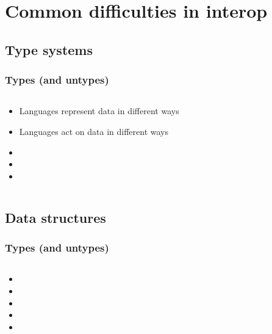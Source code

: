 \documentclass{beamer}
\begin{document}
\section[Difficulties]{Common difficulties in interop}


\subsection{Type systems}
\begin{frame}
  \frametitle{Types (and untypes)}
  
  \begin{columns}
  \begin{column}{0.6\textwidth}
  \begin{itemize}
  	\item Languages represent data in different ways %
	\item Languages act on data in different ways %
	\item 
	\item 
	\item 
  \end{itemize}
  \end{column}
  
  \begin{column}{0.5\textwidth}
  
  \end{column}
  \end{columns}
\end{frame}

\subsection{Data structures}
\begin{frame}
  \frametitle{Types (and untypes)}
  
  \begin{columns}
  \begin{column}{0.6\textwidth}
  \begin{itemize}
  	\item 
	\item 
	\item 
	\item 
	\item 
  \end{itemize}
  \end{column}
  
  \begin{column}{0.5\textwidth}
  
  \end{column}
  \end{columns}
\end{frame}
\end{document}
